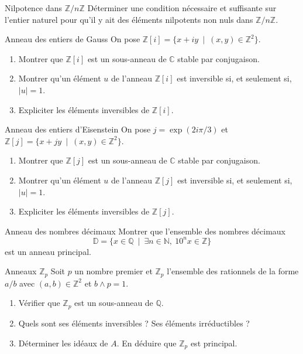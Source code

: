 \documentclass[french,a4paper]{article}
\newcommand{\N}{\mathbb{N}}
\newcommand{\Z}{\mathbb{Z}}
\newcommand{\Q}{\mathbb{Q}}
\newcommand{\C}{\mathbb{C}}
\theoremstyle{plain}
\theoremstyle{definition}
\theoremstyle{remark}
\begin{document}
\begin{ex}[Moulin.AG.38]{Nilpotence dans $\Z/n\Z$}
	Déterminer une condition nécessaire et suffisante sur l'entier naturel pour qu'il y ait des éléments nilpotents non nuls dans $\Z/n\Z$.
\end{ex}

\begin{ex}[Morlot]{Anneau des entiers de Gauss}
	On pose $\Z[i]=\{x+iy\ \mid\ (x,y)\in\Z^2\}$.
	\begin{enumerate}
		\item Montrer que $\Z[i]$ est un sous-anneau de $\C$ stable par conjugaison.
		\item Montrer qu'un élément $u$ de l'anneau $\Z[i]$ est inversible si, et seulement si, $\lvert u\rvert=1$.
		\item Expliciter les éléments inversibles de $\Z[i]$.
	\end{enumerate}
\end{ex}

\begin{ex}{Anneau des entiers d'Eisenstein}
	On pose $j=\exp\left(2i\pi/3\right)$ et $\Z[j]=\{x+jy\ \mid\ (x,y)\in\Z^2\}$.
	\begin{enumerate}
		\item Montrer que $\Z[j]$ est un sous-anneau de $\C$ stable par conjugaison.
		\item Montrer qu'un élément $u$ de l'anneau $\Z[j]$ est inversible si, et seulement si, $\lvert u\rvert=1$.
		\item Expliciter les éléments inversibles de $\Z[j]$.
	\end{enumerate}
\end{ex}

\begin{ex}[Moulin.AG.41]{Anneau des nombres décimaux}
	Montrer que l'ensemble des nombres décimaux $$\mathbb{D}=\{x\in\Q\ \mid \ \exists n\in\N,\ 10^nx\in\Z\}$$ est un anneau principal.
\end{ex}

\begin{ex}[Moulin.AG.42]{Anneaux $\Z_p$}
	Soit $p$ un nombre premier et $\Z_p$ l'ensemble des rationnels de la forme $a/b$ avec $(a,b)\in\Z^2$ et $b\wedge p=1$.
	\begin{enumerate}
		\item Vérifier que $\Z_p$ est un sous-anneau de $\Q$.
		\item Quels sont ses éléments inversibles ? Ses éléments irréductibles ?
		\item Déterminer les idéaux de $A$. En déduire que $\Z_p$ est principal.
	\end{enumerate}
\end{ex}
\end{document}
